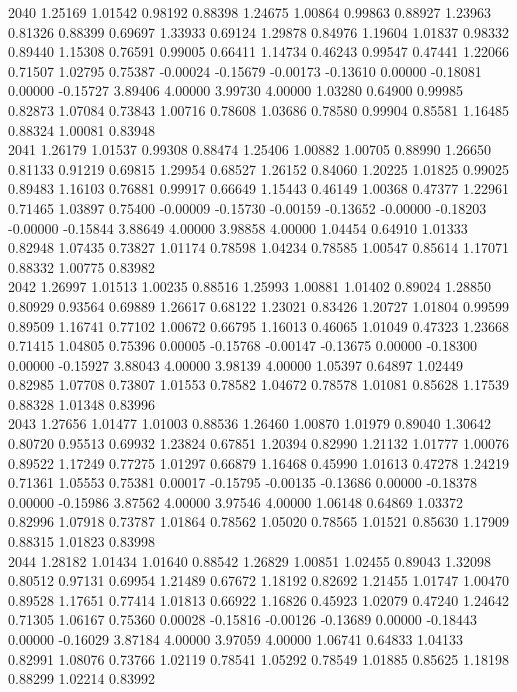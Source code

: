 {2040 1.25169 1.01542 0.98192 0.88398 1.24675 1.00864 0.99863 0.88927 1.23963 0.81326 0.88399 0.69697 1.33933 0.69124 1.29878 0.84976 1.19604 1.01837 0.98332 0.89440 1.15308 0.76591 0.99005 0.66411 1.14734 0.46243 0.99547 0.47441 1.22066 0.71507 1.02795 0.75387 -0.00024 -0.15679 -0.00173 -0.13610 0.00000 -0.18081 0.00000 -0.15727 3.89406 4.00000 3.99730 4.00000 1.03280 0.64900 0.99985 0.82873 1.07084 0.73843 1.00716 0.78608 1.03686 0.78580 0.99904 0.85581 1.16485 0.88324 1.00081 0.83948 \\
2041 1.26179 1.01537 0.99308 0.88474 1.25406 1.00882 1.00705 0.88990 1.26650 0.81133 0.91219 0.69815 1.29954 0.68527 1.26152 0.84060 1.20225 1.01825 0.99025 0.89483 1.16103 0.76881 0.99917 0.66649 1.15443 0.46149 1.00368 0.47377 1.22961 0.71465 1.03897 0.75400 -0.00009 -0.15730 -0.00159 -0.13652 -0.00000 -0.18203 -0.00000 -0.15844 3.88649 4.00000 3.98858 4.00000 1.04454 0.64910 1.01333 0.82948 1.07435 0.73827 1.01174 0.78598 1.04234 0.78585 1.00547 0.85614 1.17071 0.88332 1.00775 0.83982 \\
2042 1.26997 1.01513 1.00235 0.88516 1.25993 1.00881 1.01402 0.89024 1.28850 0.80929 0.93564 0.69889 1.26617 0.68122 1.23021 0.83426 1.20727 1.01804 0.99599 0.89509 1.16741 0.77102 1.00672 0.66795 1.16013 0.46065 1.01049 0.47323 1.23668 0.71415 1.04805 0.75396 0.00005 -0.15768 -0.00147 -0.13675 0.00000 -0.18300 0.00000 -0.15927 3.88043 4.00000 3.98139 4.00000 1.05397 0.64897 1.02449 0.82985 1.07708 0.73807 1.01553 0.78582 1.04672 0.78578 1.01081 0.85628 1.17539 0.88328 1.01348 0.83996 \\
2043 1.27656 1.01477 1.01003 0.88536 1.26460 1.00870 1.01979 0.89040 1.30642 0.80720 0.95513 0.69932 1.23824 0.67851 1.20394 0.82990 1.21132 1.01777 1.00076 0.89522 1.17249 0.77275 1.01297 0.66879 1.16468 0.45990 1.01613 0.47278 1.24219 0.71361 1.05553 0.75381 0.00017 -0.15795 -0.00135 -0.13686 0.00000 -0.18378 0.00000 -0.15986 3.87562 4.00000 3.97546 4.00000 1.06148 0.64869 1.03372 0.82996 1.07918 0.73787 1.01864 0.78562 1.05020 0.78565 1.01521 0.85630 1.17909 0.88315 1.01823 0.83998 \\
2044 1.28182 1.01434 1.01640 0.88542 1.26829 1.00851 1.02455 0.89043 1.32098 0.80512 0.97131 0.69954 1.21489 0.67672 1.18192 0.82692 1.21455 1.01747 1.00470 0.89528 1.17651 0.77414 1.01813 0.66922 1.16826 0.45923 1.02079 0.47240 1.24642 0.71305 1.06167 0.75360 0.00028 -0.15816 -0.00126 -0.13689 0.00000 -0.18443 0.00000 -0.16029 3.87184 4.00000 3.97059 4.00000 1.06741 0.64833 1.04133 0.82991 1.08076 0.73766 1.02119 0.78541 1.05292 0.78549 1.01885 0.85625 1.18198 0.88299 1.02214 0.83992 \\
}
